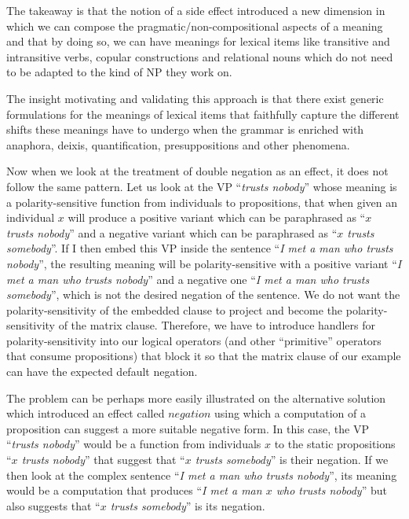 \documentclass[a4paper,11pt,DIV=12]{scrartcl}
\begin{document}
The takeaway is that the notion of a side effect introduced a new dimension
in which we can compose the pragmatic/non-compositional aspects of a
meaning and that by doing so, we can have meanings for lexical items like
transitive and intransitive verbs, copular constructions and relational
nouns which do not need to be adapted to the kind of NP they work on.

The insight motivating and validating this approach is that there exist
generic formulations for the meanings of lexical items that faithfully
capture the different shifts these meanings have to undergo when the
grammar is enriched with anaphora, deixis, quantification, presuppositions
and other phenomena.

Now when we look at the treatment of double negation as an effect, it does
not follow the same pattern. Let us look at the VP ``\textit{trusts
  nobody}'' whose meaning is a polarity-sensitive function from individuals
to propositions, that when given an individual $x$ will produce a positive
variant which can be paraphrased as ``\textit{$x$ trusts nobody}'' and a
negative variant which can be paraphrased as ``\textit{$x$ trusts
  somebody}''.  If I then embed this VP inside the sentence ``\textit{I met
  a man who trusts nobody}'', the resulting meaning will be
polarity-sensitive with a positive variant ``\textit{I met a man who trusts
  nobody}'' and a negative one ``\textit{I met a man who trusts
  somebody}'', which is not the desired negation of the sentence. We do not
want the polarity-sensitivity of the embedded clause to project and become
the polarity-sensitivity of the matrix clause. Therefore, we have to
introduce handlers for polarity-sensitivity into our logical operators (and
other ``primitive'' operators that consume propositions) that block it so
that the matrix clause of our example can have the expected default
negation.

The problem can be perhaps more easily illustrated on the alternative
solution which introduced an effect called $negation$ using which a
computation of a proposition can suggest a more suitable negative form. In
this case, the VP ``\textit{trusts nobody}'' would be a function from
individuals $x$ to the static propositions ``\textit{$x$ trusts nobody}''
that suggest that ``\textit{$x$ trusts somebody}'' is their negation. If we
then look at the complex sentence ``\textit{I met a man who trusts
  nobody}'', its meaning would be a computation that produces ``\textit{I
  met a man $x$ who trusts nobody}'' but also suggests that ``\textit{$x$
  trusts somebody}'' is its negation.
\end{document}
